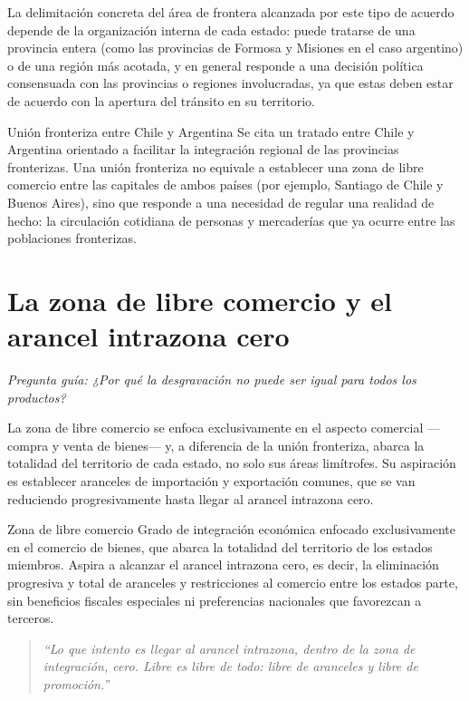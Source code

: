 \documentclass[12pt,oneside]{book}
\newenvironment{citadocente}
  {\begin{quote}\itshape\RaggedRight}
  {\end{quote}}
\begin{document}
La delimitación concreta del área de frontera alcanzada por este tipo de acuerdo depende de la organización interna de cada estado: puede tratarse de una provincia entera (como las provincias de Formosa y Misiones en el caso argentino) o de una región más acotada, y en general responde a una decisión política consensuada con las provincias o regiones involucradas, ya que estas deben estar de acuerdo con la apertura del tránsito en su territorio.

\begin{example}{Unión fronteriza entre Chile y Argentina}
Se cita un tratado entre Chile y Argentina orientado a facilitar la integración regional de las provincias fronterizas. Una unión fronteriza no equivale a establecer una zona de libre comercio entre las capitales de ambos países (por ejemplo, Santiago de Chile y Buenos Aires), sino que responde a una necesidad de regular una realidad de hecho: la circulación cotidiana de personas y mercaderías que ya ocurre entre las poblaciones fronterizas.
\end{example}

\section{La zona de libre comercio y el arancel intrazona cero}

\textit{Pregunta guía: ¿Por qué la desgravación no puede ser igual para todos los productos?}

La zona de libre comercio se enfoca exclusivamente en el aspecto comercial —compra y venta de bienes— y, a diferencia de la unión fronteriza, abarca la totalidad del territorio de cada estado, no solo sus áreas limítrofes. Su aspiración es establecer aranceles de importación y exportación comunes, que se van reduciendo progresivamente hasta llegar al arancel intrazona cero.

\begin{definition}{Zona de libre comercio}
Grado de integración económica enfocado exclusivamente en el comercio de bienes, que abarca la totalidad del territorio de los estados miembros. Aspira a alcanzar el arancel intrazona cero, es decir, la eliminación progresiva y total de aranceles y restricciones al comercio entre los estados parte, sin beneficios fiscales especiales ni preferencias nacionales que favorezcan a terceros.
\end{definition}

\begin{citadocente}
``Lo que intento es llegar al arancel intrazona, dentro de la zona de integración, cero. Libre es libre de todo: libre de aranceles y libre de promoción.''
\end{citadocente}
\end{document}
